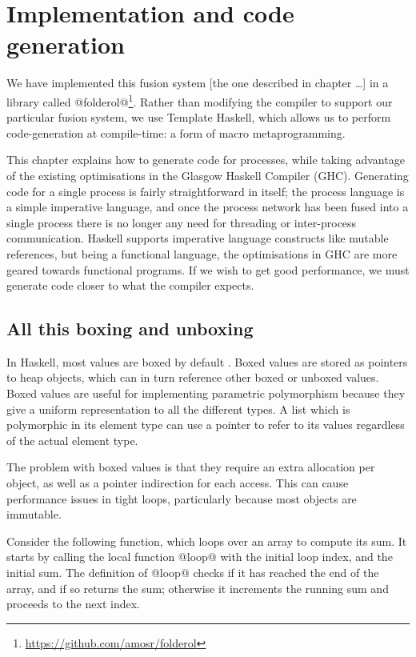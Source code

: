 \chapter{Implementation and code generation}
\label{chapter:process:implementation}


We have implemented this fusion system [the one described in chapter \ldots] in a library called @folderol@\footnote{\url{https://github.com/amosr/folderol}}.
Rather than modifying the compiler to support our particular fusion system, we use Template Haskell, which allows us to perform code-generation at compile-time: a form of macro metaprogramming.

This chapter explains how to generate code for processes, while taking advantage of the existing optimisations in the Glasgow Haskell Compiler (GHC).
Generating code for a single process is fairly straightforward in itself; the process language is a simple imperative language, and once the process network has been fused into a single process there is no longer any need for threading or inter-process communication.
Haskell supports imperative language constructs like mutable references, but being a functional language, the optimisations in GHC are more geared towards functional programs.
If we wish to get good performance, we must generate code closer to what the compiler expects.

\section{All this boxing and unboxing}
In Haskell, most values are boxed by default \citep{jones1991unboxed}.
Boxed values are stored as pointers to heap objects, which can in turn reference other boxed or unboxed values.
Boxed values are useful for implementing parametric polymorphism because they give a uniform representation to all the different types.
A list which is polymorphic in its element type can use a pointer to refer to its values regardless of the actual element type.

The problem with boxed values is that they require an extra allocation per object, as well as a pointer indirection for each access.
This can cause performance issues in tight loops, particularly because most objects are immutable.

Consider the following function, which loops over an array to compute its sum.
It starts by calling the local function @loop@ with the initial loop index, and the initial sum.
The definition of @loop@ checks if it has reached the end of the array, and if so returns the sum; otherwise it increments the running sum and proceeds to the next index.

